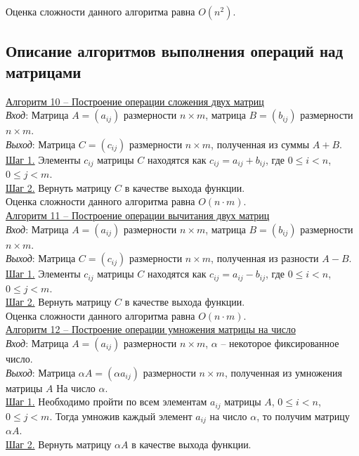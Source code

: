 \documentclass[bachelor, och, labwork]{shiza}
\begin{document}
        Оценка сложности данного алгоритма равна $O(n^2)$.\\

    \subsection{Описание алгоритмов выполнения операций над матрицами}
        
        \underline{Алгоритм 10 -- Построение операции сложения двух матриц}\\
            \textit{Вход}: Матрица $A = (a_{ij})$ размерности $n \times m$, матрица $B = (b_{ij})$ размерности $n \times m$.\\
            \textit{Выход}: Матрица $C = (c_{ij})$ размерности $n \times m$, полученная из суммы $A + B$.\\
            \underline{Шаг 1.} Элементы $c_{ij}$ матрицы $C$ находятся как $c_{ij} = a_{ij} + b_{ij}$, где
            $0 \leq i < n$, $0 \leq j < m$. \\
            \underline{Шаг 2.} Вернуть матрицу $C$ в качестве выхода функции.\\
            
            Оценка сложности данного алгоритма равна $O(n \cdot m)$.\\

        \underline{Алгоритм 11 -- Построение операции вычитания двух матриц}\\
            \textit{Вход}: Матрица $A = (a_{ij})$ размерности $n \times m$, матрица $B = (b_{ij})$ размерности $n \times m$.\\
            \textit{Выход}: Матрица $C = (c_{ij})$ размерности $n \times m$, полученная из разности $A - B$.\\
            \underline{Шаг 1.} Элементы $c_{ij}$ матрицы $C$ находятся как $c_{ij} = a_{ij} - b_{ij}$, где
            $0 \leq i < n$, $0 \leq j < m$. \\
            \underline{Шаг 2.} Вернуть матрицу $C$ в качестве выхода функции.\\
            
            Оценка сложности данного алгоритма равна $O(n \cdot m)$.\\

        \underline{Алгоритм 12 -- Построение операции умножения матрицы на число}\\
            \textit{Вход}: Матрица $A = (a_{ij})$ размерности $n \times m$, $\alpha$ -- некоторое фиксированное число.\\
            \textit{Выход}: Матрица $\alpha A = (\alpha a_{ij})$ размерности $n \times m$, полученная из умножения матрицы $A$ На
            число $\alpha$.\\
            \underline{Шаг 1.} Необходимо пройти по всем элементам $a_{ij}$ матрицы $A$, $0 \leq i < n$, $0 \leq j < m$. Тогда умножив каждый элемент $a_{ij}$ на число $\alpha$, то
            получим матрицу $\alpha A$.\\
            \underline{Шаг 2.} Вернуть матрицу $\alpha A$ в качестве выхода функции.
            
\end{document}
